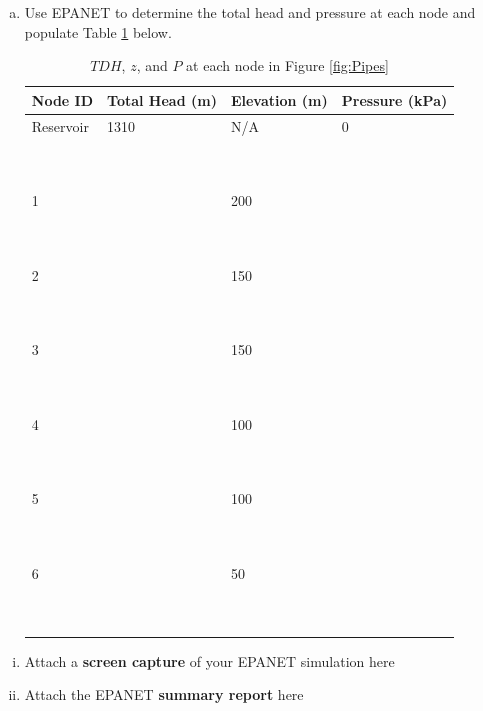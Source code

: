 \documentclass[12pt]{article}
\begin{document}
\begin{enumerate}
\begin{enumerate}[a)]
\clearpage
\item Use EPANET to determine the total head and pressure at each node and populate Table \ref{tab:booktabs} below.
\begin{table}[htbp]
      \caption{$TDH$, $z$,  and $P$ at  each node in Figure \ref{fig:Pipes} \\}
   \begin{tabular}{| p{1in} | p{1.1in} | p{1in} | p{1.1in} | } %
   \hline
   \hline
Node ID & Total Head (m) & Elevation (m) & Pressure (kPa) \\
\hline
\hline
Reservoir & 1310 & N/A & 0  \\
~ & ~ & ~ & ~  \\
~ & ~ & ~ & ~  \\
\hline
1 & ~ & 200 & ~  \\
~ & ~ & ~ & ~  \\
~ & ~ & ~ & ~  \\
\hline
2 & ~ & 150 & ~  \\
~ & ~ & ~ & ~  \\
~ & ~ & ~ & ~  \\
\hline
3 & ~ & 150 & ~  \\
~ & ~ & ~ & ~  \\
~ & ~ & ~ & ~  \\
\hline
4 & ~ & 100 & ~  \\
~ & ~ & ~ & ~  \\
~ & ~ & ~ & ~  \\
\hline
5 & ~ & 100 & ~  \\
~ & ~ & ~ & ~  \\
~ & ~ & ~ & ~  \\
\hline
6 & ~ & 50 & ~  \\
~ & ~ & ~ & ~  \\
~ & ~ & ~ & ~  \\
\hline
\hline

   \end{tabular}

   \label{tab:booktabs}
\end{table}
\end{enumerate}


\begin{enumerate}[i)]
\item Attach a \textbf{screen capture} of your EPANET simulation here
\item Attach the EPANET \textbf{summary report} here
\end{enumerate}


\end{enumerate}
\end{document}

